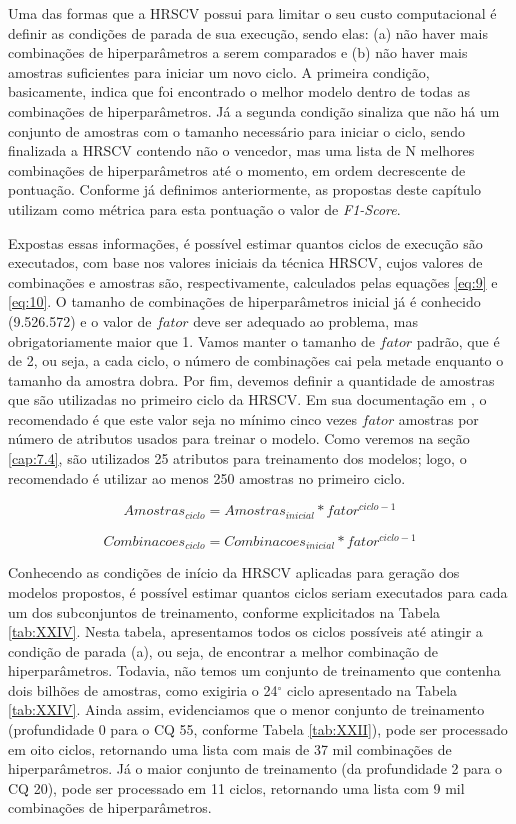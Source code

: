 Uma das formas que a HRSCV possui para limitar o seu custo computacional é definir as condições de parada de sua execução, sendo elas: (a) não haver mais combinações de hiperparâmetros a serem comparados e (b) não haver mais amostras suficientes para iniciar um novo ciclo. A primeira condição, basicamente, indica que foi encontrado o melhor modelo dentro de todas as combinações de hiperparâmetros. Já a segunda condição sinaliza que não há um conjunto de amostras com o tamanho necessário para iniciar o ciclo, sendo finalizada a HRSCV contendo não o vencedor, mas uma lista de N melhores combinações de hiperparâmetros até o momento, em ordem decrescente de pontuação. Conforme já definimos anteriormente, as propostas deste capítulo utilizam como métrica para esta pontuação o valor de \textit{F1-Score}.

Expostas essas informações, é possível estimar quantos ciclos de execução são executados, com base nos valores iniciais da técnica HRSCV, cujos valores de combinações e amostras são, respectivamente, calculados pelas equações \ref{eq:9} e \ref{eq:10}. O tamanho de combinações de hiperparâmetros inicial já é conhecido (9.526.572) e o valor de $fator$ deve ser adequado ao problema, mas obrigatoriamente maior que 1. Vamos manter o tamanho de $fator$ padrão, que é de 2, ou seja, a cada ciclo, o número de combinações cai pela metade enquanto o tamanho da amostra dobra. Por fim, devemos definir a quantidade de amostras que são utilizadas no primeiro ciclo da HRSCV. Em sua documentação em \citet{bib:halvingrandomsearch}, o recomendado é que este valor seja no mínimo cinco vezes $fator$ amostras por número de atributos usados para treinar o modelo. Como veremos na seção \ref{cap:7.4}, são utilizados 25 atributos para treinamento dos modelos; logo, o recomendado é utilizar ao menos 250 amostras no primeiro ciclo.

\begin{equation}
    \label{eq:9}
    Amostras_{ciclo}=Amostras_{inicial}*fator^{ciclo - 1}
\end{equation}

\begin{equation}
    \label{eq:10}
    Combinacoes_{ciclo}=Combinacoes_{inicial}*fator^{ciclo - 1}
\end{equation}

Conhecendo as condições de início da HRSCV aplicadas para geração dos modelos propostos, é possível estimar quantos ciclos seriam executados para cada um dos subconjuntos de treinamento, conforme explicitados na Tabela \ref{tab:XXIV}. Nesta tabela, apresentamos todos os ciclos possíveis até atingir a condição de parada (a), ou seja, de encontrar a melhor combinação de hiperparâmetros. Todavia, não temos um conjunto de treinamento que contenha dois bilhões de amostras, como exigiria o 24$^\circ$ ciclo apresentado na Tabela \ref{tab:XXIV}. Ainda assim, evidenciamos que o menor conjunto de treinamento (profundidade 0 para o CQ 55, conforme Tabela \ref{tab:XXII}), pode ser processado em oito ciclos, retornando uma lista com mais de 37 mil combinações de hiperparâmetros. Já o maior conjunto de treinamento (da profundidade 2 para o CQ 20), pode ser processado em 11 ciclos, retornando uma lista com 9 mil combinações de hiperparâmetros.

